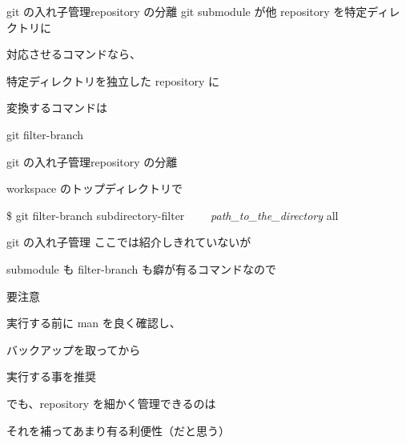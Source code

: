 % 
% 
% 
% 

\begin{frame}[t]{git の入れ子管理}{repository の分離}
  git submodule が他 repository を特定ディレクトリに

  対応させるコマンドなら、
  \vspace{2ex}

  特定ディレクトリを独立した repository に

  変換するコマンドは

  git filter-branch
\end{frame}


\begin{frame}[t]{git の入れ子管理}{repository の分離}

  workspace のトップディレクトリで
  \vspace{2ex}

  \$ git filter-branch {\dhyphen}subdirectory-filter {\bslash}
  ~~~~\textit{path\_to\_the\_directory} {\dhyphen} {\dhyphen}all
  \vspace{4ex}

  \vspace{2ex}

  \vspace{2ex}

\end{frame}

\begin{frame}[t]{git の入れ子管理}{}
  ここでは紹介しきれていないが

  submodule も filter-branch も癖が有るコマンドなので

  要注意
  \vspace{4ex}

  実行する前に man を良く確認し、

  バックアップを取ってから

  実行する事を推奨
  \vspace{4ex}

  でも、repository を細かく管理できるのは

  それを補ってあまり有る利便性（だと思う）
\end{frame}
